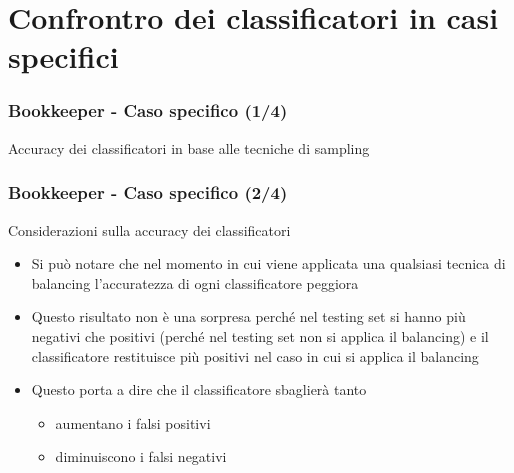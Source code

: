 \documentclass[
	usepdftitle=false,
	xcolor={table, dvipsnames},
	hyperref={
		pdftitle={Machine Learning per Software Engineering},
    	pdfauthor={Alessando Chillotti}
    }
]{beamer}
\begin{document}
\section{Confrontro dei classificatori in casi specifici}
\begin{frame}
\frametitle{Bookkeeper - Caso specifico (1/4)}
\begin{block}{Accuracy dei classificatori in base alle tecniche di sampling}
\begin{figure}[ht!]
\end{figure}
\end{block}
\end{frame}

\begin{frame}
\frametitle{Bookkeeper - Caso specifico (2/4)}
\begin{block}{Considerazioni sulla accuracy dei classificatori}
\begin{itemize}
\item Si può notare che nel momento in cui viene applicata una qualsiasi tecnica di balancing l'accuratezza di ogni classificatore peggiora
\item Questo risultato non è una sorpresa perché nel testing set si hanno più negativi che positivi (perché nel testing set non si applica il balancing) e il classificatore restituisce più positivi nel caso in cui si applica il balancing 
\item Questo porta a dire che il classificatore sbaglierà tanto
\begin{itemize}
\item aumentano i falsi positivi
\item diminuiscono i falsi negativi
\end{itemize}
\end{itemize}
\end{block}
\end{frame}
\end{document}
